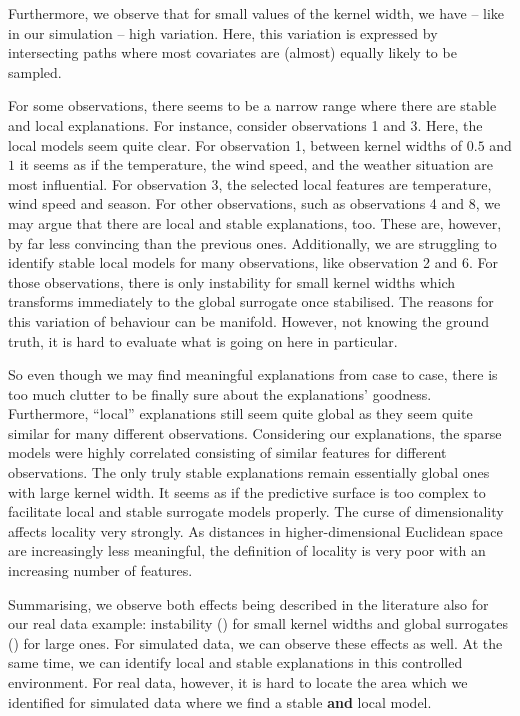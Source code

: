 \documentclass[
]{krantz}
\begin{document}
Furthermore, we observe that for small values of the kernel width, we have -- like in our simulation -- high variation.
Here, this variation is expressed by intersecting paths where most covariates are (almost) equally likely to be sampled.

For some observations, there seems to be a narrow range where there are stable and local explanations.
For instance, consider observations 1 and 3.
Here, the local models seem quite clear.
For observation 1, between kernel widths of \(0.5\) and \(1\) it seems as if the temperature, the wind speed, and the weather situation are most influential.
For observation 3, the selected local features are temperature, wind speed and season.
For other observations, such as observations 4 and 8, we may argue that there are local and stable explanations, too.
These are, however, by far less convincing than the previous ones.
Additionally, we are struggling to identify stable local models for many observations, like observation 2 and 6.
For those observations, there is only instability for small kernel widths which transforms immediately to the global surrogate once stabilised.
The reasons for this variation of behaviour can be manifold.
However, not knowing the ground truth, it is hard to evaluate what is going on here in particular.

So even though we may find meaningful explanations from case to case, there is too much clutter to be finally sure about the explanations' goodness.
Furthermore, ``local'' explanations still seem quite global as they seem quite similar for many different observations.
Considering our explanations, the sparse models were highly correlated consisting of similar features for different observations.
The only truly stable explanations remain essentially global ones with large kernel width.
It seems as if the predictive surface is too complex to facilitate local and stable surrogate models properly.
The curse of dimensionality affects locality very strongly.
As distances in higher-dimensional Euclidean space are increasingly less meaningful, the definition of locality is very poor with an increasing number of features.

Summarising, we observe both effects being described in the literature also for our real data example:
instability (\citet{alvarez2018robustness}) for small kernel widths and global surrogates (\citet{laugel2018defining}) for large ones.
For simulated data, we can observe these effects as well.
At the same time, we can identify local and stable explanations in this controlled environment.
For real data, however, it is hard to locate the area which we identified for simulated data where we find a stable \textbf{and} local model.
\end{document}
